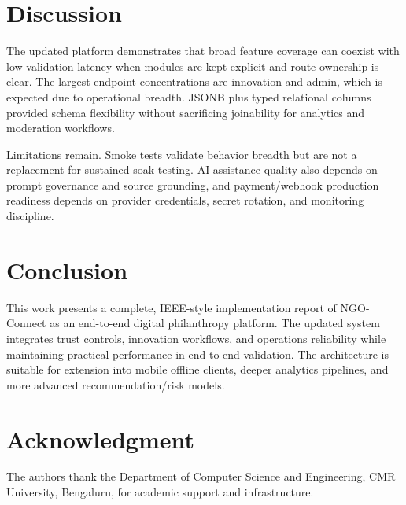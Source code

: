 \documentclass[conference]{IEEEtran}
\begin{document}
\section{Discussion}
The updated platform demonstrates that broad feature coverage can coexist with low validation latency when modules are kept explicit and route ownership is clear. The largest endpoint concentrations are innovation and admin, which is expected due to operational breadth. JSONB plus typed relational columns provided schema flexibility without sacrificing joinability for analytics and moderation workflows.

Limitations remain. Smoke tests validate behavior breadth but are not a replacement for sustained soak testing. AI assistance quality also depends on prompt governance and source grounding, and payment/webhook production readiness depends on provider credentials, secret rotation, and monitoring discipline.

\section{Conclusion}
This work presents a complete, IEEE-style implementation report of NGO-Connect as an end-to-end digital philanthropy platform. The updated system integrates trust controls, innovation workflows, and operations reliability while maintaining practical performance in end-to-end validation. The architecture is suitable for extension into mobile offline clients, deeper analytics pipelines, and more advanced recommendation/risk models.

\section*{Acknowledgment}
The authors thank the Department of Computer Science and Engineering, CMR University, Bengaluru, for academic support and infrastructure.
\end{document}
